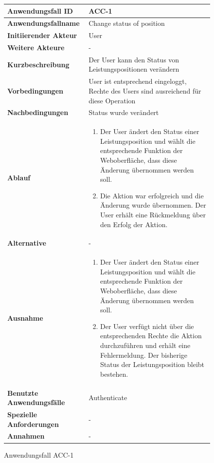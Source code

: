 \begin{figure}[h]
	\centering
	\begin{tabularx}{\textwidth}{ X | X }
		\textbf{Anwendungsfall ID} & ACC-1 \\ \hline
		\textbf{Anwendungsfallname} & Change status of position\\ \hline
		\textbf{Initiierender Akteur} & User \\ \hline
		\textbf{Weitere Akteure} & -  \\ \hline
		\textbf{Kurzbeschreibung} & Der User kann den Status von Leistungspositionen ver\"andern \\ \hline
		\textbf{Vorbedingungen} & User ist entsprechend eingeloggt, Rechte des Users sind ausreichend f\"ur diese Operation \\ \hline
		\textbf{Nachbedingungen} & Status wurde ver\"andert \\ \hline
		\textbf{Ablauf} &
		\begin{enumerate}
			\item Der User \"andert den Status einer Leistungsposition und w\"ahlt die entsprechende Funktion der Weboberfl\"ache, dass diese \"Anderung \"ubernommen werden soll.
			\item Die Aktion war erfolgreich und die \"Anderung wurde \"ubernommen.  Der User erh\"alt eine R\"uckmeldung \"uber den Erfolg der Aktion.
		\end{enumerate} \\ \hline
		\textbf{Alternative} & -
		\\ \hline
		\textbf{Ausnahme} &
		\begin{enumerate}
			\item Der User \"andert den Status einer Leistungsposition und w\"ahlt die entsprechende Funktion der Weboberfl\"ache,  dass diese \"Anderung \"ubernommen werden soll.
			\item Der User verf\"ugt nicht \"uber die entsprechenden Rechte die Aktion durchzuf\"uhren und erh\"alt eine Fehlermeldung. Der bisherige Status der Leistungsposition bleibt bestehen.
		\end{enumerate}  \\ \hline
		\textbf{Benutzte Anwendungsfälle} & Authenticate \\ \hline
		\textbf{Spezielle Anforderungen} & - \\ \hline
		\textbf{Annahmen} & -
	\end{tabularx}
	\caption{Anwendungsfall ACC-1}
	\label{fig:anwendungsfall-server-tabelle-ACC-1}
\end{figure}

